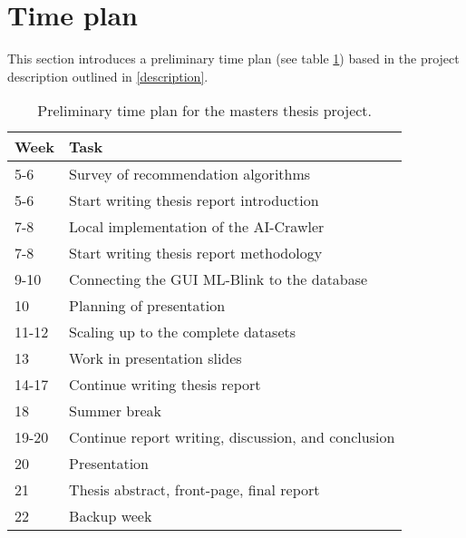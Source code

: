 \section{Time plan}

This section introduces a preliminary time plan (see table \ref{timeline:time_plan}) based in the project description outlined in \ref{description}.

\begin{table}
  \centering
  \begin{tabularx}{\textwidth}{|l|X|}
    \hline
    Week & Task \\
    \hline
    5-6 & Survey of recommendation algorithms \\
    5-6 & Start writing thesis report introduction \\
    7-8 & Local implementation of the AI-Crawler \\
    7-8 & Start writing thesis report methodology \\
    9-10 & Connecting the GUI ML-Blink to the database \\
    10 & Planning of presentation \\
    11-12 & Scaling up to the complete datasets \\
    13 & Work in presentation slides \\
    14-17 & Continue writing thesis report \\
    18 & Summer break \\
    19-20 & Continue report writing, discussion, and conclusion \\
    20 & Presentation \\
    21 & Thesis abstract, front-page, final report \\
    22 & Backup week \\
    \hline
  \end{tabularx}
  \caption{Preliminary time plan for the masters thesis project.}
  \label{timeline:time_plan}
\end{table}